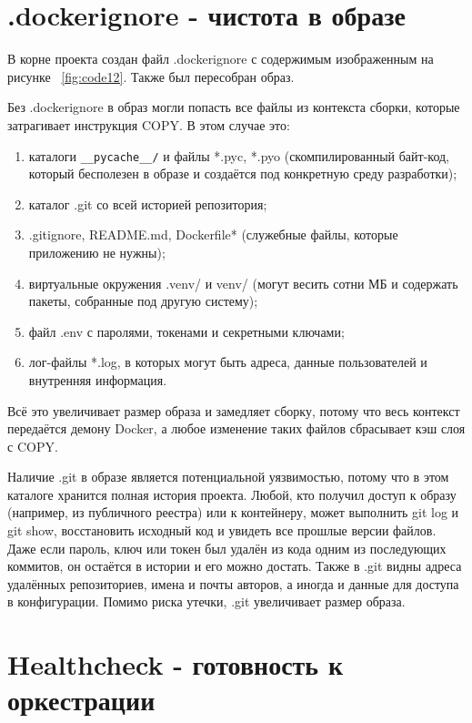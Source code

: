 \section{.dockerignore - чистота в образе}

В корне проекта создан файл .dockerignore с содержимым изображенным на рисунке ~\ref{fig:code12}. Также был пересобран образ.


Без .dockerignore в образ могли попасть все файлы из контекста сборки, которые затрагивает инструкция COPY. В этом случае это:
\begin{enumerate}
    \item каталоги \texttt{\_\_pycache\_\_/} и файлы *.pyc, *.pyo (скомпилированный байт-код, который бесполезен в образе и создаётся под конкретную среду разработки);
    \item каталог .git со всей историей репозитория;
    \item .gitignore, README.md, Dockerfile* (служебные файлы, которые приложению не нужны);
    \item виртуальные окружения .venv/ и venv/ (могут весить сотни МБ и содержать пакеты, собранные под другую систему);
    \item файл .env с паролями, токенами и секретными ключами;
    \item лог-файлы *.log, в которых могут быть адреса, данные пользователей и внутренняя информация.
\end{enumerate}

Всё это увеличивает размер образа и замедляет сборку, потому что весь контекст передаётся демону Docker, а любое изменение таких файлов сбрасывает кэш слоя с COPY.

Наличие .git в образе является потенциальной уязвимостью, потому что в этом каталоге хранится полная история проекта. Любой, кто получил доступ к образу (например, из публичного реестра) или к контейнеру, может выполнить git log и git show, восстановить исходный код и увидеть все прошлые версии файлов. Даже если пароль, ключ или токен был удалён из кода одним из последующих коммитов, он остаётся в истории и его можно достать. Также в .git видны адреса удалённых репозиториев, имена и почты авторов, а иногда и данные для доступа в конфигурации. Помимо риска утечки, .git увеличивает размер образа.

\section{Healthcheck - готовность к оркестрации}


